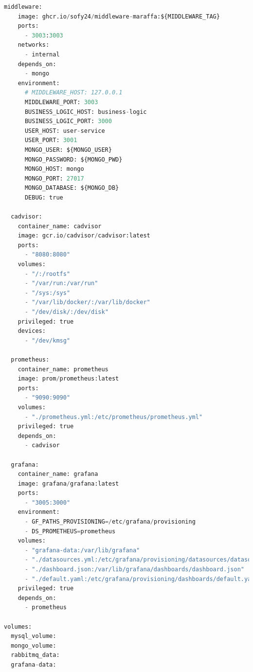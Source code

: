 \begin{lstlisting}[language=Python, caption={Docker Compose di progetto}, label=list:docker_compose]
  middleware:
    image: ghcr.io/sofy24/middleware-maraffa:${MIDDLEWARE_TAG}
    ports:
      - 3003:3003
    networks:
      - internal
    depends_on:
      - mongo
    environment:
      # MIDDLEWARE_HOST: 127.0.0.1
      MIDDLEWARE_PORT: 3003
      BUSINESS_LOGIC_HOST: business-logic
      BUSINESS_LOGIC_PORT: 3000
      USER_HOST: user-service
      USER_PORT: 3001
      MONGO_USER: ${MONGO_USER}
      MONGO_PASSWORD: ${MONGO_PWD}
      MONGO_HOST: mongo
      MONGO_PORT: 27017
      MONGO_DATABASE: ${MONGO_DB}
      DEBUG: true

  cadvisor:
    container_name: cadvisor
    image: gcr.io/cadvisor/cadvisor:latest
    ports:
      - "8080:8080"
    volumes:
      - "/:/rootfs"
      - "/var/run:/var/run"
      - "/sys:/sys"
      - "/var/lib/docker/:/var/lib/docker"
      - "/dev/disk/:/dev/disk"
    privileged: true
    devices:
      - "/dev/kmsg"

  prometheus:
    container_name: prometheus
    image: prom/prometheus:latest
    ports:
      - "9090:9090"
    volumes:
      - "./prometheus.yml:/etc/prometheus/prometheus.yml"
    privileged: true
    depends_on:
      - cadvisor

  grafana:
    container_name: grafana
    image: grafana/grafana:latest
    ports:
      - "3005:3000"
    environment:
      - GF_PATHS_PROVISIONING=/etc/grafana/provisioning
      - DS_PROMETHEUS=prometheus
    volumes:
      - "grafana-data:/var/lib/grafana"
      - "./datasources.yml:/etc/grafana/provisioning/datasources/datasources.yml"
      - "./dashboard.json:/var/lib/grafana/dashboards/dashboard.json"
      - "./default.yaml:/etc/grafana/provisioning/dashboards/default.yaml"
    privileged: true
    depends_on:
      - prometheus

volumes:
  mysql_volume:
  mongo_volume:
  rabbitmq_data:
  grafana-data:

\end{lstlisting}


